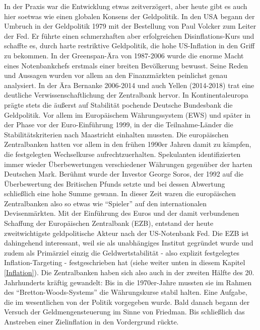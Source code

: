 In der Praxis war die Entwicklung etwas zeitverzögert, aber heute gibt es auch hier soetwas wie einen globalen Konsens der Geldpolitik. In den USA begann der Umbruch in der Geldpolitik 1979 mit der Bestellung von Paul Volcker zum Leiter der Fed. Er führte einen schmerzhaften aber erfolgreichen Disinflations-Kurs und schaffte es, durch harte restriktive Geldpolitik, die hohe US-Inflation in den Griff zu bekommen. In der Greenspan-Ära von 1987-2006 wurde die enorme Macht eines Notenbankchefs erstmals einer breiten Bevölkerung bewusst. Seine Reden und Aussagen wurden vor allem an den Finanzmärkten peinlichst genau analysiert. In der Ära Bernanke 2006-2014 und auch Yellen (2014-2018) trat eine deutliche Verwissenschaftlichung der Zentralbank hervor. In Kontinentaleuropa prägte stets die äußerst auf Stabilität pochende Deutsche Bundesbank die Geldpolitik. Vor allem im Europäischem Währungssystem (EWS) und später in der Phase vor der Euro-Einführung 1999, in der die Teilnahme-Länder die Stabilitätskriterien nach Maastricht einhalten mussten. Die europäischen Zentralbanken hatten vor allem in den frühen 1990er Jahren damit zu kämpfen, die festgelegten Wechselkurse aufrechtzuerhalten. Spekulanten identifizierten immer wieder Überbewertungen verschiedener Währungen gegenüber der harten Deutschen Mark. Berühmt wurde der Investor George Soros, der 1992 auf die Überbewertung des Britischen Pfunds setzte und bei dessen Abwertung schließlich eine hohe Summe gewann. In dieser Zeit waren die europäischen Zentralbanken also so etwas wie "`Spieler"' auf den internationalen Devisenmärkten. Mit der Einführung des Euros und der damit verbundenen Schaffung der Europäischen Zentralbank (EZB), entstand der heute zweitwichtigste geldpolitische Akteur nach der US-Notenbank Fed. Die EZB ist dahingehend interessant, weil sie als unabhängiges Institut gegründet wurde und zudem als Primärziel einzig die Geldwertstabilität - also explizit festgelegtes Inflation-Targeting - festgeschrieben hat (siehe weiter unten in diesem Kapitel \ref{Inflation}). Die Zentralbanken haben sich also auch in der zweiten Hälfte des 20. Jahrhunderts kräftig gewandelt: Bis in die 1970er-Jahre mussten sie im Rahmen des "`Bretton-Woods-Systems"' die Währungskurse stabil halten. Eine Aufgabe, die im wesentlichen von der Politik vorgegeben wurde. Bald danach begann der Versuch der Geldmengensteuerung im Sinne von Friedman. Bis schließlich das Anstreben einer Zielinflation in den Vordergrund rückte.







